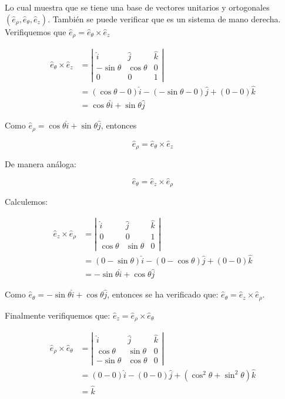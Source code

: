 Lo cual muestra que se tiene una base de vectores unitarios y ortogonales $\left(\hat{e}_{\rho}, \hat{e}_{\theta}, \hat{e}_{z}\right)$. También se puede verificar que es un sistema de mano derecha. Verifiquemos que $\widehat{e}_{\rho}=\hat{e}_{\theta} \times \hat{e}_{z}$

$$
\begin{aligned}
\hat{e}_{\theta} \times \widehat{e}_{z} & =\left|\begin{array}{ccc}
\hat{i} & \hat{j} & \hat{k} \\
-\sin \theta & \cos \theta & 0 \\
0 & 0 & 1
\end{array}\right| \\
& =(\cos \theta-0) \hat{i}-(-\sin \theta-0) \hat{j}+(0-0) \hat{k} \\
& =\cos \theta \hat{i}+\sin \theta \hat{j}
\end{aligned}
$$

Como $\hat{e}_{\rho}=\cos \theta \hat{i}+\sin \theta \hat{j}$, entonces

$$
\hat{e}_{\rho}=\hat{e}_{\theta} \times \hat{e}_{z}
$$

De manera análoga:

$$
\hat{e}_{\theta}=\widehat{e}_{z} \times \widehat{e}_{\rho}
$$

Calculemos:

$$
\begin{aligned}
\hat{e}_{z} \times \hat{e}_{\rho} & =\left|\begin{array}{ccc}
\hat{i} & \hat{j} & \hat{k} \\
0 & 0 & 1 \\
\cos \theta & \sin \theta & 0
\end{array}\right| \\
& =(0-\sin \theta) \hat{i}-(0-\cos \theta) \hat{j}+(0-0) \hat{k} \\
& =-\sin \theta \hat{i}+\cos \theta \hat{j}
\end{aligned}
$$

Como $\hat{e}_{\theta}=-\sin \theta \hat{i}+\cos \theta \hat{j}$, entonces se ha verificado que: $\hat{e}_{\theta}=\hat{e}_{z} \times \hat{e}_{\rho}$.

Finalmente verifiquemos que: $\widehat{e}_{z}=\widehat{e}_{\rho} \times \widehat{e}_{\theta}$

$$
\begin{aligned}
\widehat{e}_{\rho} \times \widehat{e}_{\theta} & =\left|\begin{array}{ccc}
\hat{i} & \hat{j} & \hat{k} \\
\cos \theta & \sin \theta & 0 \\
-\sin \theta & \cos \theta & 0
\end{array}\right| \\
& =(0-0) \hat{i}-(0-0) \hat{j}+\left(\cos ^{2} \theta+\sin ^{2} \theta\right) \hat{k} \\
& =\widehat{k}
\end{aligned}
$$

